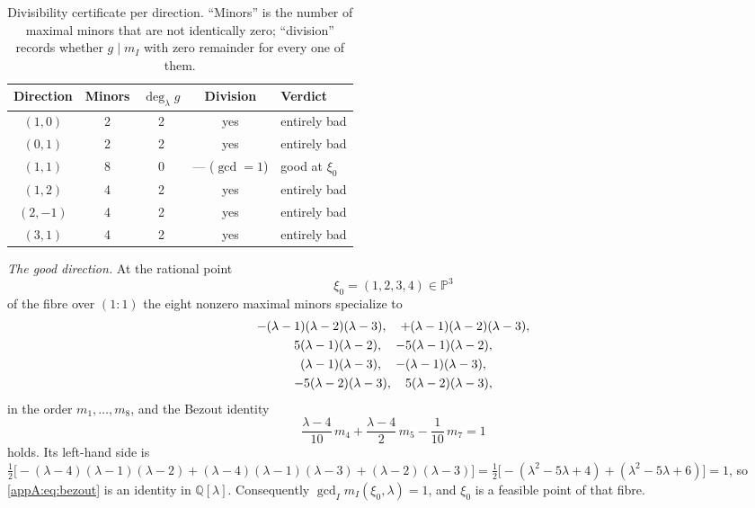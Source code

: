 \documentclass[journal]{IEEEtran}
\theoremstyle{plainn}
\theoremstyle{remark}
\begin{document}
\begin{table}[t]
\centering
\caption{Divisibility certificate per direction. ``Minors'' is the number of maximal minors that are not
identically zero; ``division'' records whether $g\mid m_I$ with zero remainder for every one of them.}
\label{appA:tab:cert}\label{appA:tab:dirs}
\begin{tabular}{@{}c c c c l@{}}
\toprule
Direction & Minors & $\deg_\lambda g$ & Division & Verdict \\
\midrule
$(1,0)$  & 2 & 2 & yes & entirely bad \\
$(0,1)$  & 2 & 2 & yes & entirely bad \\
$(1,1)$  & 8 & 0 & --- ($\gcd=1$) & good at $\xi_0$ \\
$(1,2)$  & 4 & 2 & yes & entirely bad \\
$(2,-1)$ & 4 & 2 & yes & entirely bad \\
$(3,1)$  & 4 & 2 & yes & entirely bad \\
\bottomrule
\end{tabular}
\end{table}

\emph{The good direction.} At the rational point
\begin{equation}\label{appA:eq:xipoint}
\xi_0=(1,2,3,4)\in\mathbb P^3
\end{equation}
of the fibre over $(1\!:\!1)$ the eight nonzero maximal minors specialize to
\begin{gather}
-(\lambda-1)(\lambda-2)(\lambda-3),\quad +(\lambda-1)(\lambda-2)(\lambda-3),\notag\\
5(\lambda-1)(\lambda-2),\quad -5(\lambda-1)(\lambda-2),\notag\\
(\lambda-1)(\lambda-3),\quad -(\lambda-1)(\lambda-3),\notag\\
-5(\lambda-2)(\lambda-3),\quad 5(\lambda-2)(\lambda-3),\label{appA:eq:spec}
\end{gather}
in the order $m_1,\dots,m_8$, and the Bezout identity
\begin{equation}\label{appA:eq:bezout}
\frac{\lambda-4}{10}\,m_4+\frac{\lambda-4}{2}\,m_5-\frac{1}{10}\,m_7=1
\end{equation}
holds. Its left-hand side is
$\frac{1}{2}\bigl[-(\lambda-4)(\lambda-1)(\lambda-2)+(\lambda-4)(\lambda-1)(\lambda-3)+(\lambda-2)(\lambda-3)\bigr]
=\frac{1}{2}\bigl[-(\lambda^2-5\lambda+4)+(\lambda^2-5\lambda+6)\bigr]=1$,
so \eqref{appA:eq:bezout} is an identity in $\mathbb Q[\lambda]$. Consequently
$\gcd_I m_I(\xi_0,\lambda)=1$, and $\xi_0$ is a feasible point of that fibre.
\end{document}
